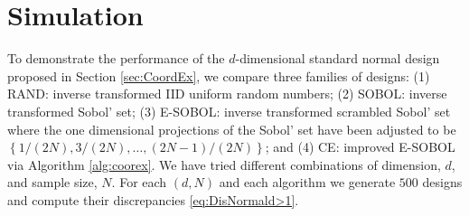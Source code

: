 \documentclass[graybox]{svmult}
\begin{document}




\section{Simulation} \label{sec:Simulation}

To demonstrate the performance of the $d$-dimensional standard normal design proposed in Section \ref{sec:CoordEx}, we compare three families of designs: (1) RAND: inverse transformed IID uniform random numbers;  (2) SOBOL: inverse transformed Sobol' set; (3) E-SOBOL: inverse transformed scrambled Sobol' set where the one dimensional projections of the Sobol' set have been adjusted to be  $\left\{1/(2N), 3/(2N), \ldots, (2N-1)/(2N) \right\}$; and (4) CE: improved E-SOBOL via Algorithm \ref{alg:coorex}. 
We have tried different combinations of dimension, $d$, and sample size, $N$. 
For each $(d,N)$ and each algorithm we generate $500$ designs and compute their discrepancies \eqref{eq:DisNormald>1}.  
\end{document}
